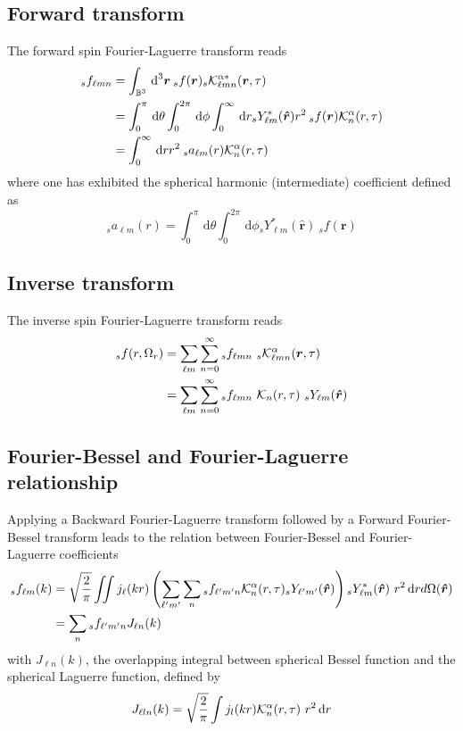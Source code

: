 \documentclass[a4paper,11pt]{article}
\newcommand{\ball}{\ensuremath{{\mathbb{B}^3}}}
\newcommand{\dx}{\ensuremath{\mathrm{\,d}}}
\newcommand{\rvec}{{\boldsymbol{r}}}
\newcommand{\rang}{{\boldsymbol{\hat{r}}}}
\newcommand{\rlen}{{r}}
\begin{document}
\subsection{Forward transform}
%
The forward spin Fourier-Laguerre transform reads
\begin{align}
{}_sf_{\ell m n} &= \int_\ball \dx ^3 \rvec \: {}_sf(\rvec) {}_s{\cal K}_{\ell m n}^{\alpha \ast}(\rvec, \tau)
\nonumber \\
& = \int_0^{\pi}\dx \theta 
  \int_0^{2\pi} \dx \phi
  \int_0^\infty \dx \rlen 
   {}_sY_{\ell m}^\ast(\rang) 
  \rlen^2 \: {}_sf(\rvec) {\cal K}_n^\alpha(r, \tau)
\nonumber \\
&=   \int_0^\infty \dx \rlen  \rlen^2 \: {}_s a_{\ell m}(r)  {\cal K}_n^\alpha(r, \tau)
\label{eq-FLag-Forward-spin}
\end{align}
where one has exhibited the spherical harmonic (intermediate) coefficient defined as
\begin{equation}
{}_s a_{\ell m}(r) =  
\int_0^{\pi}\dx \theta 
  \int_0^{2\pi} \dx \phi  {}_sY_{\ell m}^\ast(\rang) \: {}_sf(\rvec)
\end{equation} 
%
\subsection{Inverse transform}
%
The inverse spin Fourier-Laguerre transform reads
\begin{align}
{}_sf(r,\Omega_r) &= \sum_{\ell m} \sum_{n=0}^{\infty} {}_sf_{\ell mn}\  {}_s{\cal K}_{\ell m n}^\alpha(\rvec, \tau) 
\nonumber \\
 &= \sum_{\ell m}  \sum_{n=0}^{\infty} {}_sf_{\ell mn}\  {\cal K}_n(r,\tau)\ {}_sY_{\ell m}(\rang) 
 \label{eq-FLag-inverse-spin}
\end{align}
%
\subsection{Fourier-Bessel and Fourier-Laguerre relationship}
%
Applying a Backward Fourier-Laguerre transform followed by a Forward Fourier-Bessel transform leads to the relation between Fourier-Bessel and Fourier-Laguerre coefficients
\begin{align}
{}_s f_{\ell m}(k) &= \sqrt{\frac{2}{\pi}}\iint j_\ell(k r) \left( \sum_{\ell^\prime m^\prime}\sum_n {}_s f_{\ell^\prime m^\prime n} {\cal K}^\alpha_n(r,\tau) {}_sY_{\ell^\prime m^\prime}(\rang)\right) {}_sY_{\ell m}^\ast(\rang) \ r^2 \dx r d\Omega(\rang) \\ \nonumber
& = \sum_n {}_s f_{\ell^\prime m^\prime n} J_{\ell n}(k)
\end{align}
with $J_{\ell n}(k)$, the overlapping integral between spherical Bessel function and the spherical Laguerre function, defined by
\begin{equation}
J_{\ell ln}(k) = \sqrt{\frac{2}{\pi}}\int j_l(k r) {\cal K}^\alpha_n(r,\tau)\ r^2 \dx r 
\end{equation}
%
\end{document}
